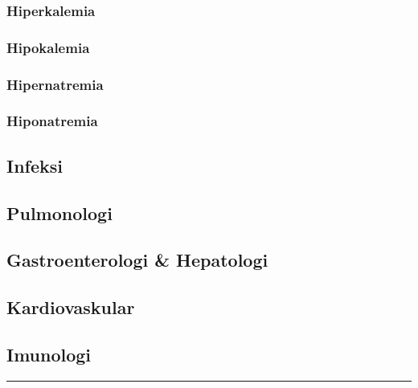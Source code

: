\documentclass[
]{book}
\begin{document}
\hypertarget{hiperkalemia}{%
\subsubsection{Hiperkalemia}\label{hiperkalemia}}

\hypertarget{hipokalemia}{%
\subsubsection{Hipokalemia}\label{hipokalemia}}

\hypertarget{hipernatremia}{%
\subsubsection{Hipernatremia}\label{hipernatremia}}

\hypertarget{hiponatremia}{%
\subsubsection{Hiponatremia}\label{hiponatremia}}

\hypertarget{infeksi}{%
\subsection{Infeksi}\label{infeksi}}

\hypertarget{pulmonologi}{%
\subsection{Pulmonologi}\label{pulmonologi}}

\hypertarget{gastroenterologi-hepatologi}{%
\subsection{Gastroenterologi \& Hepatologi}\label{gastroenterologi-hepatologi}}

\hypertarget{kardiovaskular-1}{%
\subsection{Kardiovaskular}\label{kardiovaskular-1}}

\hypertarget{imunologi}{%
\subsection{Imunologi}\label{imunologi}}

\begin{center}\rule{0.5\linewidth}{0.5pt}\end{center}
\end{document}

